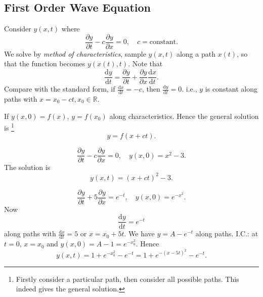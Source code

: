 \documentclass[a4paper]{article}
\begin{document}
    \subsection{First Order Wave Equation}
    Consider $ y(x,t) $ where 
    \[
        \frac{\partial y}{\partial t}-c \frac{\partial y}{\partial x}=0,\quad c = \text{constant}.  
    \]
    We solve by \textit{method of characteristics}, sample $y(x,t)$ along a path $x(t)$, so that the function becomes $ y(x(t),t) $. Note that 
    \[
        \frac{\mathrm{d}y}{\mathrm{d}t} = \frac{\partial y}{\partial t}+\frac{\partial y}{\partial x}\frac{\mathrm{d}x}{\mathrm{d}t}.    
    \]
    Compare with the standard form, if $ \frac{\mathrm{d}x}{\mathrm{d}t}=-c  $, then $ \frac{\mathrm{d}y}{\mathrm{d}t}=0  $. i.e., $y$ is constant along paths with $ x=x_0-ct, x_0\in \mathbb{R} $.
    \begin{center}
      \end{center}
      If $ y(x,0)=f(x) $, $ y = f(x_0) $ along characteristics. Hence the general solution is \footnote{Firstly consider a particular path, then consider all possible paths. This indeed gives the general solution.}
      \[
          y=f(x+ct).
      \]
      \begin{example}
          \[
              \frac{\partial y}{\partial t}-c \frac{\partial y}{\partial x}=0, \quad y(x,0)=x^2-3.  
          \]
          The solution is 
          \[
              y(x,t)=(x+ct)^2-3.
          \]
      \end{example}
      \begin{example}
          \[
            \frac{\partial y}{\partial t}+5 \frac{\partial y}{\partial x}=e^{-t}, \quad y(x,0)=e^{-x^2}.
          \]
          Now 
          \[
              \frac{\mathrm{d}y}{\mathrm{d}t} = e^{-t} 
          \]
          along paths with $ \frac{\mathrm{d}x}{\mathrm{d}t} =5 $ or $ x=x_0+5t $. We have $ y=A-e^{-t} $ along paths. I.C.: at $t=0$, $x=x_0$ and $ y(x,0)=A-1=e^{-x_0^2} $. Hence 
          \[
              y(x,t)=1+e^{-x_0^2}-e^{-t} = 1+e^{-(x-5t)^2}-e^{-t}.
          \]
      \end{example}
\end{document}
